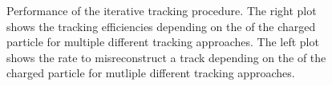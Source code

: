 \begin{figure}[htbp!]
  \begin{center}
\caption{Performance of the iterative tracking procedure\cite{Sirunyan:2017ulk}. The right plot shows the tracking efficiencies depending on the \pt of the charged particle for multiple different tracking approaches. 
         The left plot shows the rate to misreconstruct a track depending on the \pt of the charged particle for mutliple different tracking approaches. 
  \label{fig:reco_trackingEff}}
  \end{center}
\end{figure}

